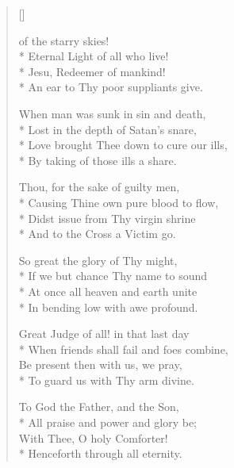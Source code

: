 \newHymn
{}

\settowidth{\versewidth}{An ear to Thy poor suppliants give}

\begin{verse}[\versewidth]
\begin{altverse}
 of the starry skies!\\*
Eternal Light of all who live!\\*
Jesu, Redeemer of mankind!\\*
An ear to Thy poor suppliants give.
\end{altverse}
\pointorig

\begin{altverse}
 When man was sunk in sin and death,\\*
Lost in the depth of Satan's snare,\\*
Love brought Thee down to cure our ills,\\*
By taking of those ills a share.
\end{altverse}

\begin{altverse}
 Thou, for the sake of guilty men,\\*
Causing Thine own pure blood to flow,\\*
Didst issue from Thy virgin shrine\\*
And to the Cross a Victim go.
\end{altverse}

\begin{altverse}
 So great the glory of Thy might,\\*
If we but chance Thy name to sound\\*
At once all heaven and earth unite\\*
In bending low with awe profound.
\end{altverse}

\begin{altverse}
 Great Judge of all! in that last day\\*
When friends shall fail and foes combine,\\
Be present then with us, we pray,\\*
To guard us with Thy arm divine.
\end{altverse}

\begin{altverse}
To God the Father, and the Son,\\*
All praise and power and glory be;\\
With Thee, O holy Comforter!\\*
Henceforth through all eternity.
\end{altverse}



\end{verse}

